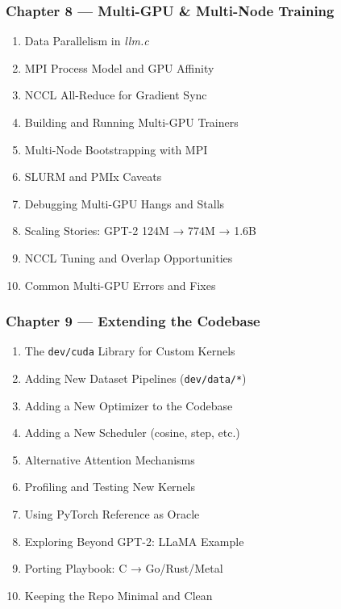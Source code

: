 \documentclass[
  letterpaper,
  DIV=11,
  numbers=noendperiod]{scrreprt}
\providecommand{\tightlist}{%
  \setlength{\itemsep}{0pt}\setlength{\parskip}{0pt}}
\begin{document}
\subsubsection{Chapter 8 --- Multi-GPU \& Multi-Node
Training}\label{chapter-8-multi-gpu-multi-node-training}

\begin{enumerate}
\def\labelenumi{\arabic{enumi}.}
\setcounter{enumi}{70}
\tightlist
\item
  Data Parallelism in \emph{llm.c}
\item
  MPI Process Model and GPU Affinity
\item
  NCCL All-Reduce for Gradient Sync
\item
  Building and Running Multi-GPU Trainers
\item
  Multi-Node Bootstrapping with MPI
\item
  SLURM and PMIx Caveats
\item
  Debugging Multi-GPU Hangs and Stalls
\item
  Scaling Stories: GPT-2 124M → 774M → 1.6B
\item
  NCCL Tuning and Overlap Opportunities
\item
  Common Multi-GPU Errors and Fixes
\end{enumerate}

\subsubsection{Chapter 9 --- Extending the
Codebase}\label{chapter-9-extending-the-codebase}

\begin{enumerate}
\def\labelenumi{\arabic{enumi}.}
\setcounter{enumi}{80}
\tightlist
\item
  The \texttt{dev/cuda} Library for Custom Kernels
\item
  Adding New Dataset Pipelines (\texttt{dev/data/*})
\item
  Adding a New Optimizer to the Codebase
\item
  Adding a New Scheduler (cosine, step, etc.)
\item
  Alternative Attention Mechanisms
\item
  Profiling and Testing New Kernels
\item
  Using PyTorch Reference as Oracle
\item
  Exploring Beyond GPT-2: LLaMA Example
\item
  Porting Playbook: C → Go/Rust/Metal
\item
  Keeping the Repo Minimal and Clean
\end{enumerate}
\end{document}
